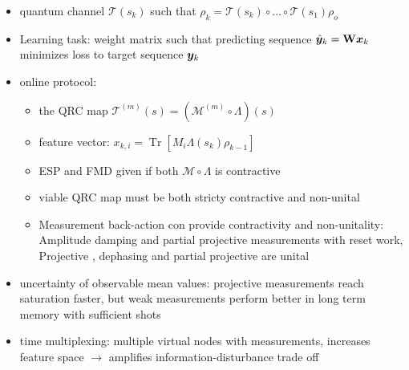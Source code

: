 \begin{itemize}
    \begin{enumerate}
        \item Depahsing measurement map: \\
        coupling unitary - $U_{PS} = CNOT_{S,P}(RY(\theta)_P \otimes I_S)$
        \item Amplitude damping measurement map \\
        coupling unitary - $U_{PS} = CNOT_{S,P}CRY(\theta)_{S,P}$ \\
        (controlled Y rotation)
        \item Partial measurement map: \\
        assign some of the units of a large system the role of the proble \\
        $\Omega_{\vct{b}_m}^{PM} = \Omega_{b_1} \otimes ... \otimes \Omega_{b_n} \otimes I^{\otimes (N-N_P)}$
    \end{enumerate}
    \item quantum channel $\mathcal{T}(s_k)$ such that $\rho_k = \mathcal{T}(s_k) \circ ... \circ \mathcal{T}(s_{1}) \rho_o$
    \item Learning task: weight matrix such that predicting sequence $\hat{{\bm{y}}}_k = \mathbf{W} {\bm{x}}_k$ minimizes loss to target sequence ${\bm{y}}_k$
    \item online protocol:
    \begin{itemize}
        \item the QRC map $\mathcal{T}^{(m)}(s) = (\mathcal{M}^{(m)}\circ \Lambda) (s)$
        \item feature vector: $x_{k,i} = \operatorname{Tr}[M_i\Lambda(s_k)\rho_{k-1}]$
        \item ESP and FMD given if both $\mathcal{M} \circ \Lambda$ is contractive
        \item viable QRC map must be both stricty contractive and non-unital
        \item Measurement back-action con provide contractivity and non-unitality: \\
        Amplitude damping and partial projective measurements with reset work, Projective , dephasing and partial projective are unital
    \end{itemize}
    \item uncertainty of observable mean values: projective measurements reach saturation faster, but weak measurements perform better in long term memory with sufficient shots
    \item time multiplexing: multiple virtual nodes with measurements, increases feature space $\to$ amplifies information-disturbance trade off
\end{itemize}



